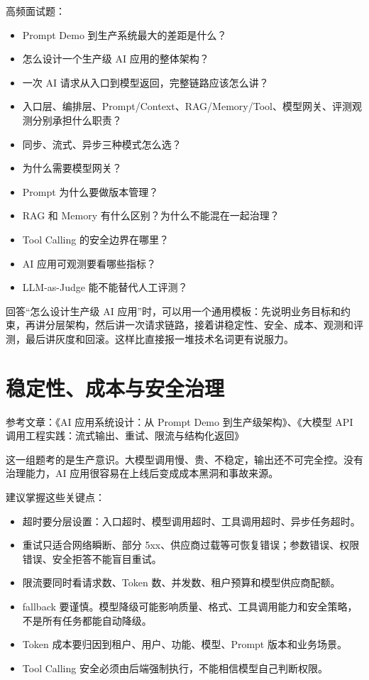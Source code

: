\documentclass[9pt,a4paper,twocolumn]{ctexart}
\begin{document}
高频面试题：


\begin{itemize}[itemsep=1pt, topsep=2pt]
  \item Prompt Demo 到生产系统最大的差距是什么？
  \item 怎么设计一个生产级 AI 应用的整体架构？
  \item 一次 AI 请求从入口到模型返回，完整链路应该怎么讲？
  \item 入口层、编排层、Prompt/Context、RAG/Memory/Tool、模型网关、评测观测分别承担什么职责？
  \item 同步、流式、异步三种模式怎么选？
  \item 为什么需要模型网关？
  \item Prompt 为什么要做版本管理？
  \item RAG 和 Memory 有什么区别？为什么不能混在一起治理？
  \item Tool Calling 的安全边界在哪里？
  \item AI 应用可观测要看哪些指标？
  \item LLM-as-Judge 能不能替代人工评测？
\end{itemize}


回答“怎么设计生产级 AI 应用”时，可以用一个通用模板：先说明业务目标和约束，再讲分层架构，然后讲一次请求链路，接着讲稳定性、安全、成本、观测和评测，最后讲灰度和回滚。这样比直接报一堆技术名词更有说服力。



\section*{稳定性、成本与安全治理}


参考文章：《AI 应用系统设计：从 Prompt Demo 到生产级架构》、《大模型 API 调用工程实践：流式输出、重试、限流与结构化返回》



这一组题考的是生产意识。大模型调用慢、贵、不稳定，输出还不可完全控。没有治理能力，AI 应用很容易在上线后变成成本黑洞和事故来源。



建议掌握这些关键点：


\begin{itemize}[itemsep=1pt, topsep=2pt]
  \item 超时要分层设置：入口超时、模型调用超时、工具调用超时、异步任务超时。
  \item 重试只适合网络瞬断、部分 5xx、供应商过载等可恢复错误；参数错误、权限错误、安全拒答不能盲目重试。
  \item 限流要同时看请求数、Token 数、并发数、租户预算和模型供应商配额。
  \item fallback 要谨慎。模型降级可能影响质量、格式、工具调用能力和安全策略，不是所有任务都能自动降级。
  \item Token 成本要归因到租户、用户、功能、模型、Prompt 版本和业务场景。
  \item Tool Calling 安全必须由后端强制执行，不能相信模型自己判断权限。
\end{itemize}
\end{document}
